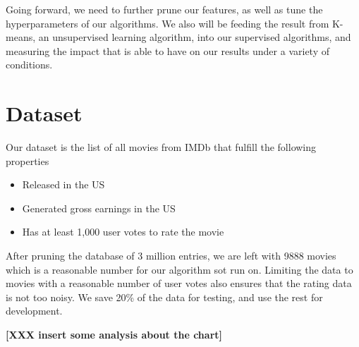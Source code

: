 \documentclass[journal]{IEEEtran}
\begin{document}
Going forward, we need to further prune our features, as well as tune the
hyperparameters of our algorithms.  We also will be feeding the result from K-means, an unsupervised learning algorithm, into our supervised algorithms, and measuring the impact that
is able to have on our results under a variety of conditions.

\section{Dataset}
Our dataset is the list of all movies from IMDb that fulfill the following properties
\begin{itemize}
	\item Released in the US
	\item Generated gross earnings in the US
	\item Has at least 1,000 user votes to rate the movie
\end{itemize}

\par After pruning the database of 3 million entries, we are left with 9888
movies which is a reasonable number for our algorithm sot run on. Limiting the
data to movies with a reasonable number of user votes also ensures that the
rating data is not too noisy. We save 20\% of the data for testing, and use the
rest for development.


\textbf{[XXX insert some analysis about the chart]}
\end{document}
